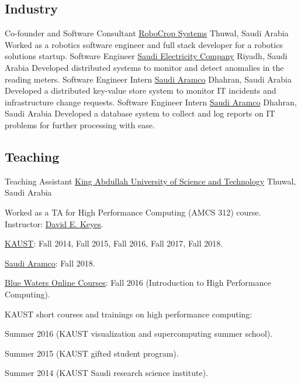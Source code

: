 \documentclass[10pt,a4paper]{moderncv}
\begin{document}
{{  \subsection{Industry}
  {
    {Co-founder and Software Consultant}
    {\href{https://innovation.kaust.edu.sa/startup-story-robocrop/}
    {RoboCrop Systems}}
    {Thuwal, Saudi Arabia}{}{
    Worked as a robotics software engineer and full stack developer
    for a robotics solutions startup.
  }
  {
    {Software Engineer}
    {\href{https://www.se.com.sa/en-us/Pages/home.aspx}
    {Saudi Electricity Company}}
    {Riyadh, Saudi Arabia}{}{
    Developed distributed systems
    to monitor and detect anomalies in the reading meters.
    }
  }
  {
    {Software Engineer Intern}
    {\href{https://www.saudiaramco.com/}
    {Saudi Aramco}}
    {Dhahran, Saudi Arabia}{}{
    Developed a distributed key-value store system to monitor
    IT incidents and infrastructure change requests.
    }
  }
  {
    {Software Engineer Intern}
    {\href{https://www.saudiaramco.com/}
    {Saudi Aramco}}
    {Dhahran, Saudi Arabia}{}{
    Developed a database system to collect and log reports on IT
    problems for further processing with ease.
    }
  }

  \subsection{Teaching}
  {
    {Teaching Assistant}
    {\href{https://www.kaust.edu.sa/en}
    {King Abdullah University of Science and Technology}}
    {Thuwal, Saudi Arabia}{}{
    Worked as a TA for High Performance Computing
    (AMCS 312) course.
    Instructor:
    \href{https://www.kaust.edu.sa/en/study/faculty/david-keyes}
    {David E. Keyes}.
      \begin{itemize}
      {
        \item
        {
          \href{https://www.kaust.edu.sa/en}{KAUST}:
          Fall 2014, Fall 2015, Fall 2016, Fall 2017, Fall 2018.
        }
        \item
        {\href{https://www.saudiaramco.com/}{Saudi Aramco}: Fall 2018.}
        \item
        {\href{https://bw-course.ncsa.illinois.edu/}{Blue Waters Online Courses}:
        Fall 2016 (Introduction to High Performance Computing).}
        \item
        KAUST short courses and trainings on high performance computing:
        \begin{itemize}
        {
          \item
          Summer 2016
          (KAUST visualization and supercomputing summer school).
          \item
          Summer 2015
          (KAUST gifted student program).
          \item
          Summer 2014
          (KAUST Saudi research science institute).
        }
        \end{itemize}
      }
      \end{itemize}
    }
  }
}
}}
\end{document}
